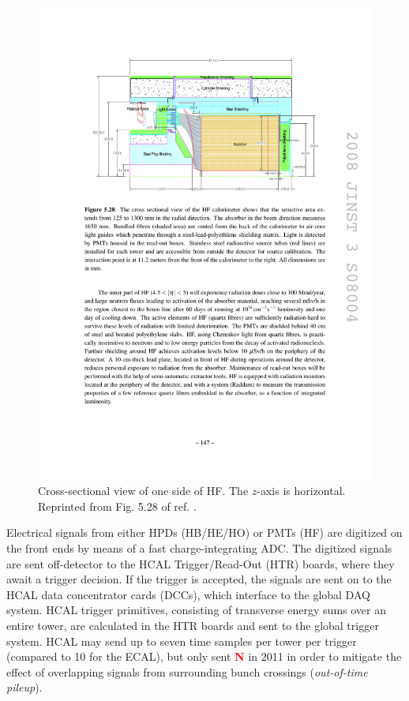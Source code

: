 \documentclass[dissertation.tex]{subfiles}
\begin{document}
\begin{figure}
	\centering
	\includegraphics[scale=1.0]{HCAL_HF_xsec}
	\caption{Cross-sectional view of one side of HF.  The $z$-axis is horizontal.  Reprinted from Fig. 5.28 of ref. \cite{CMS_detector_paper}.}
	\label{fig:HCAL_HF_xsec}
\end{figure}

Electrical signals from either HPDs (HB/HE/HO) or PMTs (HF) are digitized on the front ends by means of a fast charge-integrating ADC.  The digitized signals are sent off-detector to the HCAL Trigger/Read-Out (HTR) boards, where they await a trigger decision.  If the trigger is accepted, the signals are sent on to the HCAL data concentrator cards (DCCs), which interface to the global DAQ system.  HCAL trigger primitives, consisting of transverse energy sums over an entire tower, are calculated in the HTR boards and sent to the global trigger system.  HCAL may send up to seven time samples per tower per trigger (compared to 10 for the ECAL), but only sent \textcolor{red}{\textbf{N}} in 2011 in order to mitigate the effect of overlapping signals from surrounding bunch crossings (\textit{out-of-time pileup}).
\end{document}
